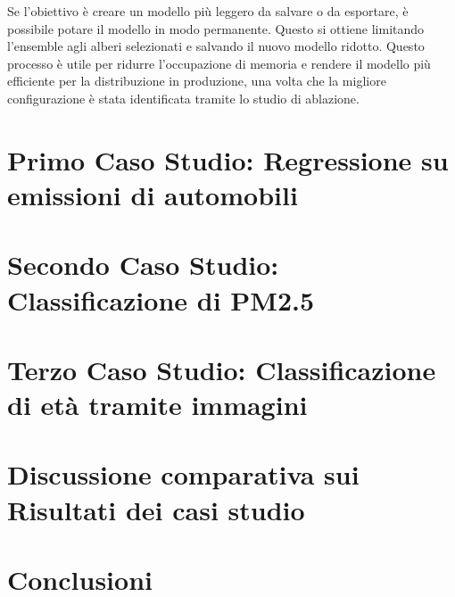 \documentclass[a4paper,12pt]{report}
\begin{document}
	Se l'obiettivo è creare un modello più leggero da salvare o da esportare, è possibile potare il modello in modo permanente. Questo si ottiene limitando l'ensemble agli alberi selezionati e salvando il nuovo modello ridotto. Questo processo è utile per ridurre l'occupazione di memoria e rendere il modello più efficiente per la distribuzione in produzione, una volta che la migliore configurazione è stata identificata tramite lo studio di ablazione.
	
	\chapter{Primo Caso Studio: Regressione su emissioni di automobili}
	
	\chapter{Secondo Caso Studio: Classificazione di PM2.5}
	
	\chapter{Terzo Caso Studio: Classificazione di età tramite immagini}
	
	\chapter{Discussione comparativa sui Risultati dei casi studio}
	
	\chapter{Conclusioni}
	
	\nocite{*}
	
	
	
\end{document}
